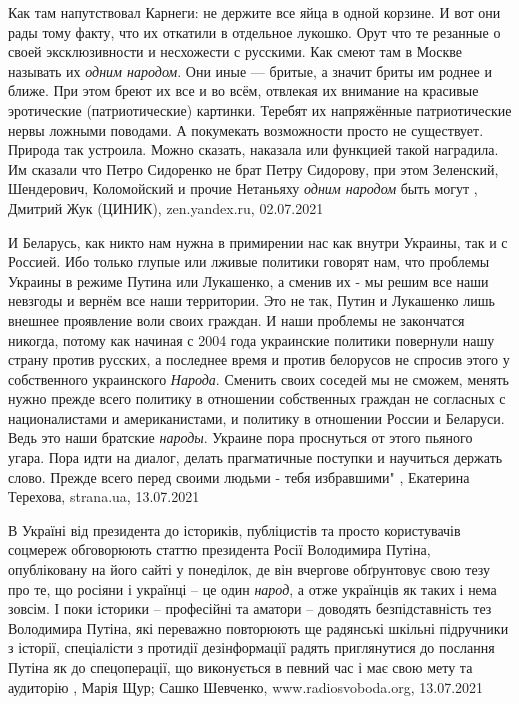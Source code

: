 Как там напутствовал Карнеги: не держите все яйца в одной корзине. И вот они
рады тому факту, что их откатили в отдельное лукошко. Орут что те резанные о
своей эксклюзивности и несхожести с русскими. Как смеют там в Москве называть
их \emph{одним народом}. Они иные — бритые, а значит бриты им роднее и ближе. При этом
бреют их все и во всём, отвлекая их внимание на красивые эротические
(патриотические) картинки. Теребят их напряжённые патриотические нервы ложными
поводами. А покумекать возможности просто не существует. Природа так устроила.
Можно сказать, наказала или функцией такой наградила. Им сказали что Петро
Сидоренко не брат Петру Сидорову, при этом Зеленский, Шендерович, Коломойский и
прочие Нетаньяху \emph{одним народом} быть могут
, Дмитрий Жук (ЦИНИК), zen.yandex.ru, 02.07.2021

И Беларусь, как никто нам нужна в примирении нас как внутри Украины, так и с
Россией. Ибо только глупые или лживые политики говорят нам, что проблемы
Украины в режиме Путина или Лукашенко, а сменив их - мы решим все наши невзгоды
и вернём все наши территории. Это не так, Путин и Лукашенко лишь внешнее
проявление воли своих граждан.  И наши проблемы не закончатся никогда, потому
как начиная с 2004 года украинские политики повернули нашу страну против
русских, а последнее время и против белорусов не спросив этого у собственного
украинского \emph{Народа}. Сменить своих соседей мы не сможем, менять нужно
прежде всего политику в отношении собственных граждан не согласных с
националистами и американистами, и политику в отношении России и Беларуси.
Ведь это наши братские \emph{народы}.  Украине пора проснуться от этого пьяного
угара. Пора идти на диалог, делать прагматичные поступки и научиться держать
слово. Прежде всего перед своими людьми - тебя избравшими"
, 
Екатерина Терехова, strana.ua, 13.07.2021

В Україні від президента до істориків, публіцистів та просто користувачів
соцмереж обговорюють статтю президента Росії Володимира Путіна, опубліковану на
його сайті у понеділок, де він вчергове обґрунтовує свою тезу про те, що
росіяни і українці – це один \emph{народ}, а отже українців як таких і нема зовсім. І
поки історики – професійні та аматори – доводять безпідставність тез Володимира
Путіна, які переважно повторюють ще радянські шкільні підручники з історії,
спеціалісти з протидії дезінформації радять приглянутися до послання Путіна як
до спецоперації, що виконується в певний час і має свою мету та аудиторію
, 
Марія Щур; Сашко Шевченко, www.radiosvoboda.org, 13.07.2021

